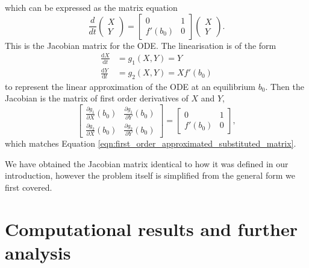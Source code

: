 which can be expressed as the matrix equation
\begin{equation}
    \frac{d}{dt}\begin{pmatrix}
        X \\
        Y
    \end{pmatrix} = \begin{bmatrix}
        0      & 1 \\
        f'(b_0) & 0
    \end{bmatrix} \begin{pmatrix}
        X \\
        Y
    \end{pmatrix}.
    \label{eqn:first_order_approximated_substituted_matrix}
\end{equation}
This is the Jacobian matrix for the ODE. The linearisation is of the form
\begin{align*}
    \frac{\mathrm{d}X}{\mathrm{d}t} &= g_1(X,Y) = Y \\
    \frac{\mathrm{d}Y}{\mathrm{d}t} &= g_2(X,Y) = Xf'(b_0) 
\end{align*}
to represent the linear approximation of the ODE at an equilibrium \(b_0\).
Then the Jacobian is the matrix of first order derivatives of $X$ and $Y$,
\begin{equation}
    \begin{bmatrix}
        \frac{\partial g_1}{\partial X}(b_0) & \frac{\partial g_1}{\partial Y}(b_0) \\
        \frac{\partial g_2}{\partial X}(b_0) & \frac{\partial g_2}{\partial Y}(b_0) 
    \end{bmatrix} = \begin{bmatrix}
        0 & 1 \\
        f'(b_0) & 0
    \end{bmatrix},
\end{equation}
which matches Equation \ref{eqn:first_order_approximated_substituted_matrix}.

We have obtained the Jacobian matrix identical to how it was defined in our introduction,
however the problem itself is simplified from the general form we first covered.


\section{Computational results and further analysis}

